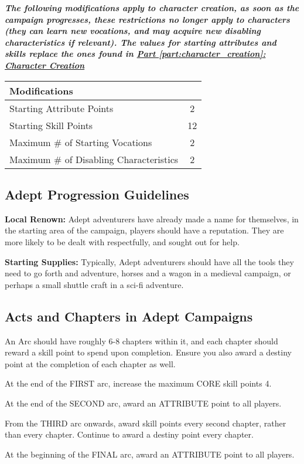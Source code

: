 \textbf{\textit{The following modifications apply to character creation, as soon as the campaign progresses, these restrictions no longer apply to characters (they can learn new vocations, and may acquire new disabling characteristics if relevant). The values for starting attributes and skills replace the ones found in \hyperref[part:character_creation]{Part \ref{part:character_creation}: Character Creation}}}

\begin{center}
    \begin{xltabular}{\textwidth}{|l c|} 
        \hline 
        \textbf{Modifications} &  \\
        \hline
        Starting Attribute Points & 2 \\
        Starting Skill Points & 12 \\ 
        Maximum \# of Starting Vocations & 2 \\
        Maximum \# of Disabling Characteristics & 2 \\
        \hline
    \end{xltabular}
\end{center}

\subsection{Adept Progression Guidelines}

\textbf{Local Renown:} Adept adventurers have already made a name for themselves, in the starting area of the campaign, players should have a reputation. They are more likely to be dealt with respectfully, and sought out for help.

\textbf{Starting Supplies:} Typically, Adept adventurers should have all the tools they need to go forth and adventure, horses and a wagon in a medieval campaign, or perhaps a small shuttle craft in a sci-fi adventure.

\subsection{Acts and Chapters in Adept Campaigns}

An Arc should have roughly 6-8 chapters within it, and each chapter should reward a skill point to spend upon completion. Ensure you also award a destiny point at the completion of each chapter as well.

\begin{displayquote}
    At the end of the FIRST arc, increase the maximum CORE skill points 4.

    At the end of the SECOND arc, award an ATTRIBUTE point to all players.

    From the THIRD arc onwards, award skill points every second chapter, rather than every chapter. Continue to award a destiny point every chapter.

    At the beginning of the FINAL arc, award an ATTRIBUTE point to all players.
\end{displayquote}

